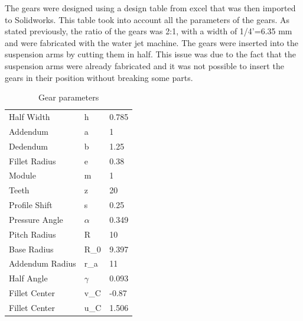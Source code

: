 \newpage
The gears were designed using a design table from excel\cite{gear} that was then imported to Solidworks. This table took into account all the parameters of the gears. As stated previously, the ratio of the gears was 2:1, with a width of 1/4'=6.35 mm and were fabricated with the water jet machine. The gears were inserted into the suspension arms by cutting them in half. This issue was due to the fact that the suspension arms were already fabricated and it was not possible to insert the gears in their position without breaking some parts.
\begin{table}[h!]
\centering
	\begin{tabular}{lll}
	\hline
	Half Width      & h  & 0.785 \\
	Addendum	    & a  & 1     \\
	Dedendum        & b  & 1.25  \\
	Fillet Radius   & e  & 0.38  \\
	Module          & m  & 1     \\
	Teeth           & z  & 20    \\
	Profile Shift   & s  & 0.25  \\
	Pressure Angle  & $\alpha$  & 0.349 \\
	Pitch Radius    & R  & 10    \\
	Base Radius     & R_{0} & 9.397 \\
	Addendum Radius & r_{a} & 11    \\
	Half Angle      & $\gamma$  & 0.093 \\
	Fillet Center   & v_{C} & -0.87 \\
	Fillet Center   & u_{C} & 1.506 \\
	\hline
	\end{tabular}
	\caption{Gear parameters}
\end{table}

